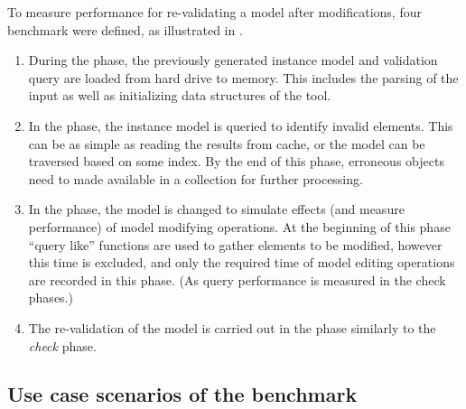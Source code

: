 To measure performance for re-validating a model after modifications, four benchmark  were defined, as illustrated in .
\begin{enumerate}
 
 \item During the  phase, the previously generated instance model and validation query are loaded from hard drive to memory. This includes the parsing of the input as well as initializing data structures of the tool.
 
 \item In the  phase, the instance model is queried to identify invalid elements. This can be as simple as reading the results from cache, or the model can be traversed based on some index. By the end of this phase, erroneous objects need to made available in a collection for further processing.
 
 \item In the  phase, the model is changed to simulate effects (and measure performance) of model modifying operations. At the beginning of this phase ``query like'' functions are used to gather elements to be modified, however this time is excluded, and only the required time of model editing operations are recorded in this phase. (As query performance is measured in the check phases.)
 
 \item The re-validation of the model is carried out in the  phase similarly to the \emph{check} phase.
\end{enumerate}

\subsection{Use case scenarios of the benchmark}
\label{sec:scenarios}

